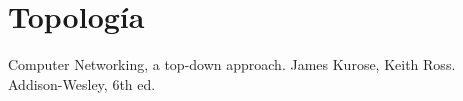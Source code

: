 \documentclass[10pt]{article}
\begin{document}
\renewcommand{\thesection}{9.\arabic{section}}
\setcounter{section}{0}
\section{Topología}












\begin{thebibliography}{9}


  Computer Networking, a top-down approach. James Kurose, Keith Ross. Addison-Wesley, 6th ed.

  \end{thebibliography}
\end{document}
